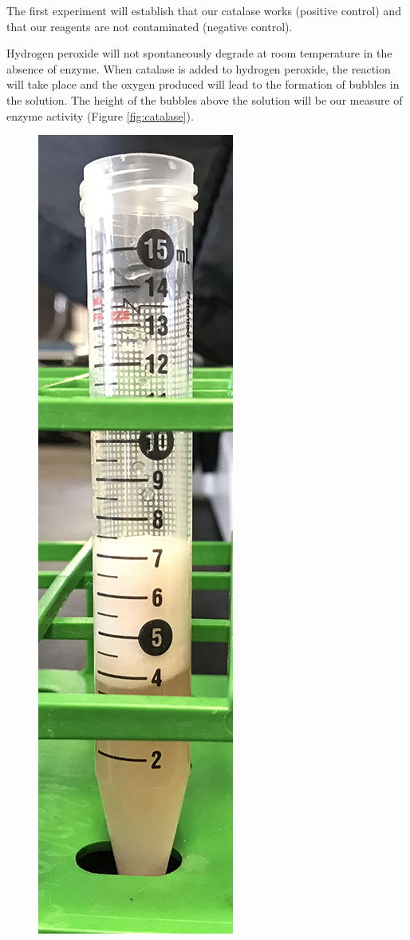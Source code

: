 The first experiment will establish that our catalase works (positive
control) and that our reagents are not contaminated (negative control).

Hydrogen peroxide will not spontaneously degrade at room temperature in
the absence of enzyme. When catalase is added to hydrogen peroxide, the
reaction will take place and the oxygen produced will lead to the
formation of bubbles in the solution. The height of the bubbles above
the solution will be our measure of enzyme activity (Figure
\ref{fig:catalase}).

\begin{figure}

{\centering \includegraphics[width=0.7\linewidth]{./figures/enzymes/catalase}

}
\end{figure}
